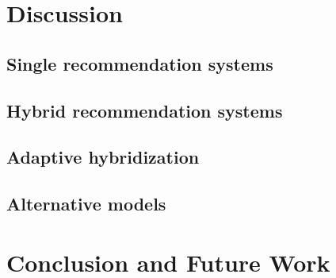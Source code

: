 \documentclass[10pt]{reportMaster}
\begin{document}
\chapter{Discussion}

\section{Single recommendation systems}

\section{Hybrid recommendation systems}

\section{Adaptive hybridization}

\section{Alternative models}







\chapter{Conclusion and Future Work}











\end{document}
